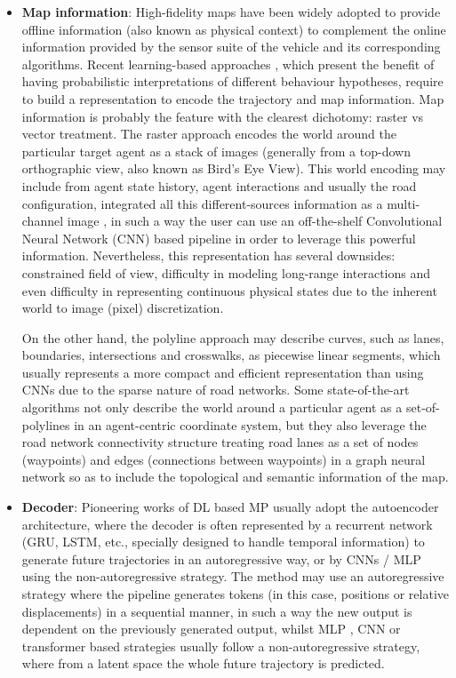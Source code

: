 \begin{itemize}
	\item \textbf{Map information}: High-fidelity maps \cite{can2022maps} have been widely adopted to provide offline information (also known as physical context) to complement the online information provided by the sensor suite of the vehicle and its corresponding algorithms. Recent learning-based approaches \cite{mahjourian2022occupancy, casas2018intentnet, ivanovic2021heterogeneous}, which present the benefit of having probabilistic interpretations of different behaviour hypotheses, require to build a representation to encode the trajectory and map information. Map information is probably the feature with the clearest dichotomy: raster vs vector treatment. The raster approach encodes the world around the particular target agent as a stack of images (generally from a top-down orthographic view, also known as Bird's Eye View). This world encoding may include from agent state history, agent interactions and usually the road configuration, integrated all this different-sources information as a multi-channel image \cite{gilles2021home}, in such a way the user can use an off-the-shelf Convolutional Neural Network (CNN) based pipeline in order to leverage this powerful information. Nevertheless, this representation has several downsides: constrained field of view, difficulty in modeling long-range interactions and even difficulty in representing continuous physical states due to the inherent world to image (pixel) discretization. 
	
	On the other hand, the polyline approach may describe curves, such as lanes, boundaries, intersections and crosswalks, as piecewise linear segments, which usually represents a more compact and efficient representation than using CNNs due to the sparse nature of road networks. Some state-of-the-art algorithms not only describe the world around a particular agent as a set-of-polylines \cite{khandelwal2020if} \cite{zhao2021tnt} in an agent-centric coordinate system, but they also leverage the road network connectivity structure \cite{liang2020learning} \cite{zeng2021lanercnn} treating road lanes as a set of nodes (waypoints) and edges (connections between waypoints) in a graph neural network so as to include the topological and semantic information of the map.
	
	\item \textbf{Decoder}: Pioneering works of DL based MP usually adopt the autoencoder architecture, where the decoder is often represented by a recurrent network (GRU, LSTM, etc., specially designed to handle temporal information) to generate future trajectories in an autoregressive way, or by CNNs \cite{gilles2021home} \cite{gilles2022gohome} / MLP \cite{liang2020learning} \cite{schmidt2022crat} using the non-autoregressive strategy. The method may use an autoregressive strategy where the pipeline generates tokens (in this case, positions or relative displacements) in a sequential manner, in such a way the new output is dependent on the previously generated output, whilst MLP \cite{schmidt2022crat}, CNN \cite{gilles2021home} or transformer \cite{ngiam2022scene} based strategies usually follow a non-autoregressive strategy, where from a latent space the whole future trajectory is predicted.
	

\end{itemize}
